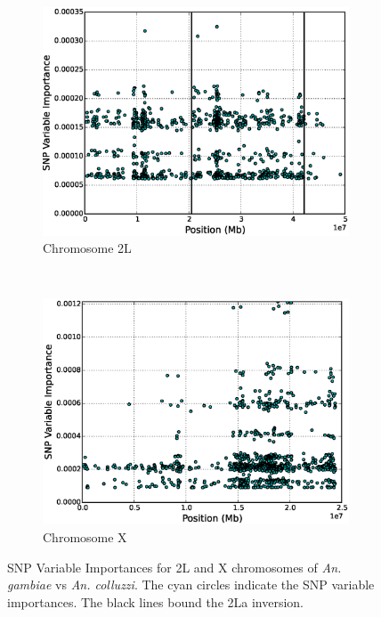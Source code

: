 \begin{figure}[H]
  \centering
  \begin{subfigure}[b]{0.45\textwidth}
    \includegraphics[width=\textwidth]{figures/random_forests/anopheles_2L_importances}
    \caption{Chromosome 2L}
    \label{fig:anopheles-2l}
  \end{subfigure}
  ~
  \begin{subfigure}[b]{0.45\textwidth}
    \includegraphics[width=\textwidth]{figures/random_forests/anopheles_X_importances}
    \caption{Chromosome X}
    \label{fig:anopheles-x}
  \end{subfigure}
  \caption{SNP Variable Importances for 2L and X chromosomes of \emph{An. gambiae} vs \emph{An. colluzzi}.  The cyan circles indicate the SNP variable importances.  The black lines bound the 2La inversion.}
  \label{fig:ranking-convergence-analysis}
\end{figure}

